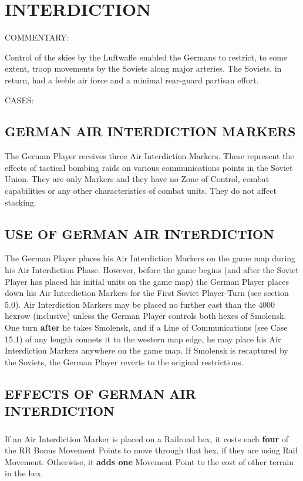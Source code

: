 \section{INTERDICTION}

COMMENTARY:

Control of the skies by the Luftwaffe enabled the Germans to restrict, to some extent, troop movements by the Soviets along major arteries. The Soviets, in return, had a feeble air force and a minimal rear-guard partisan effort.

CASES:

\subsection{GERMAN AIR INTERDICTION MARKERS}

The German Player receives three Air Interdiction Markers. These represent the effects of tactical bombing raids on various communications points in the Soviet Union. They are only Markers and they have no Zone of Control, combat capabilities or any other characteristics of combat units. They do not affect stacking.

\subsection{USE OF GERMAN AIR INTERDICTION}

The German Player places his Air Interdiction Markers on the game map during his Air Interdiction Phase. However, before the game begins (and after the Soviet Player has placed his initial units on the game map) the German Player places down his Air Interdiction Markers for the First Soviet Player-Turn (see section 5.0). Air Interdiction Markers may be placed no further east than the 4000 hexrow (inclusive) unless the German Player controls both hexes of Smolensk. One turn \textbf{after} he takes Smolensk, and if a Line of Communications (see Case 15.1) of any length connets it to the western map edge, he may place his Air Interdiction Markers anywhere on the game map. If Smolensk is recaptured by the Soviets, the German Player reverts to the original restrictions.

\subsection{EFFECTS OF GERMAN AIR INTERDICTION}

\subsubsection{} If an Air Interdiction Marker is placed on a Railroad hex, it costs each \textbf{four} of the RR Bonus Movement Points to move through that hex, if they are using Rail Movement. Otherwise, it \textbf{adds one} Movement Point to the cost of other terrain in the hex.

